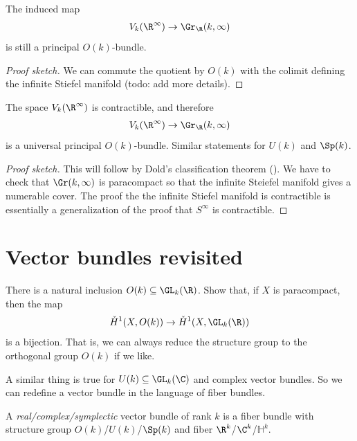 \documentclass[11pt]{book}
\begin{document}
\begin{proposition} The induced map
\begin{align*}
    V_k(\R^\infty) \to \Gr_\R(k,\infty)
\end{align*}
is still a principal $O(k)$-bundle.
\end{proposition}
\begin{proof}[Proof sketch] We can commute the quotient by $O(k)$ with the colimit defining the infinite Stiefel manifold (todo: add more details).
\end{proof}

\begin{theorem}\label{thm:stiefel-manifold-universal}
The space $V_k(\R^\infty)$ is contractible, and therefore 
\begin{align*}
    V_k(\R^\infty) \to \Gr_\R(k,\infty)
\end{align*}
is a universal principal $O(k)$-bundle. Similar statements for $U(k)$ and $\Sp(k)$.
\end{theorem}
\begin{proof}[Proof sketch] This will follow by Dold's classification theorem (). We have to check that $\Gr(k,\infty)$ is paracompact so that the infinite Steiefel manifold gives a numerable cover. The proof the the infinite Stiefel manifold is contractible is essentially a generalization of the proof that $S^\infty$ is contractible.
\end{proof}


\section{Vector bundles revisited}

\begin{exercise} There is a natural inclusion $O(k) \subseteq \GL_k(\R)$. Show that, if $X$ is paracompact, then the map
\begin{align*}
    \check{H}^1(X, O(k)) \to \check{H}^1(X,\GL_k(\R))
\end{align*}
is a bijection. That is, we can always reduce the structure group to the orthogonal group $O(k)$ if we like.
\end{exercise}

A similar thing is true for $U(k) \subseteq \GL_k(\C)$ and complex vector bundles. So we can redefine a vector bundle in the language of fiber bundles.

\begin{definition}\label{def:vector-bundle}
A \emph{real/complex/symplectic} vector bundle of rank $k$ is a fiber bundle with structure group $O(k)$/$U(k)$/$\Sp(k)$ and fiber $\R^k$/$\C^k$/$\mathbb{H}^k$.
\end{definition}
\end{document}
